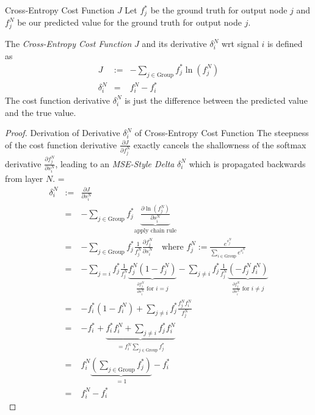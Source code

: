 \documentclass[11pt,a4paper]{article}
\begin{document}
  \begin{definition}{Cross-Entropy Cost Function $J$}
    Let $f_j^*$ be the ground truth for output node $j$ and $f_j^N$ be our predicted value for the ground truth for output node $j$.
    \par The \textit{Cross-Entropy Cost Function} $J$ and its derivative $\delta_i^N$ wrt signal $i$ is defined as
    \[\begin{array}{rrl}
    J&:=&-\displaystyle\sum_{j\in\text{Group}}f_j^*\ln(f_j^N)\\
    \delta_i^N&=&f_i^N-f_i^*
    \end{array}\]
    The cost function derivative $\delta_i^N$ is just the difference between the predicted value and the true value.
  \end{definition}

  \begin{proof}{Derivation of Derivative $\delta_i^N$ of Cross-Entropy Cost Function}
    The steepness of the cost function derivative $\frac{\partial J}{\partial f_j^N}$ exactly cancels the shallowness of the softmax derivative $\frac{\partial f_j^N}{\partial s_i^N}$, leading to an \textit{MSE-Style Delta} $\delta_i^N$ which is propagated backwards from layer $N$.
    \everymath={\displaystyle}
    \[\begin{array}{rrl}
      \delta_i^N&:=&\frac{\partial J}{\partial s_i^N}\\
      &=&-\sum_{j\in\text{Group}}f_j^*\underbrace{\frac{\partial \ln(f_j^N)}{\partial s_i^N}}_\text{apply chain rule}\\
      &=&-\sum_{j\in\text{Group}}f_j^*\frac1{f_j^N}\frac{\partial f_j^N}{\partial s_i^N}\quad\text{where }f_j^N:=\frac{e^{s_j^N}}{\sum_{i\in\text{Group}}e^{s_i^N}}\\
      &=&-\sum_{j=i}f_j^*\frac1{f_j^N}\underbrace{f_j^N(1-f_j^N)}_{\frac{\partial f_j^N}{\partial s_i^N}\text{ for }i=j}-\sum_{j\neq i}f_j^*\frac1{f_j^N}\underbrace{(-f_j^Nf_i^N)}_{\frac{\partial f_j^N}{\partial s_i^N}\text{ for }i\neq j}\\
      &=&-f_i^*(1-f_i^N)+\sum_{j\neq i}f_j^*\frac{f_j^Nf_i^N}{f_j^N}\\
      &=&-f_i^*+\underbrace{f_i^*f_i^N+\sum_{j\neq i}f_j^*f_i^N}_{=f_i^N\sum_{j\in\text{Group}}f_j^*}\\
      &=&f_i^N\underbrace{\left(\sum_{j\in\text{Group}}f_j^*\right)}_{=1}-f_i^*\\
      &=&f_i^N-f_i^*
    \end{array}\]
  \end{proof}
\end{document}
